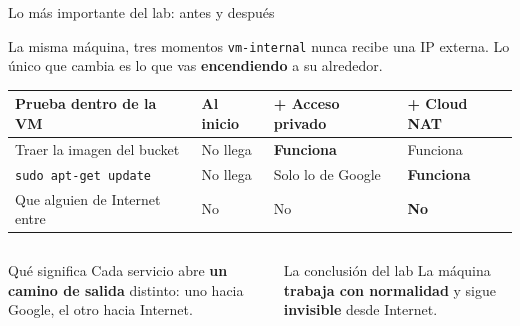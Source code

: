 \documentclass[aspectratio=169,10pt,c]{beamer}
\begin{document}
\begin{frame}{Lo más importante del lab: antes y después}
\begin{block}{La misma máquina, tres momentos}
\small \texttt{vm-internal} nunca recibe una IP externa. Lo único que cambia es lo que vas \textbf{encendiendo} a su alrededor.
\end{block}
\renewcommand{\arraystretch}{1.35}
\centering\small
\begin{tabular}{@{}p{4.9cm}p{2.3cm}p{2.6cm}p{2.6cm}@{}}
\toprule
\textbf{Prueba dentro de la VM} & \textbf{Al inicio} & \textbf{+ Acceso privado} & \textbf{+ Cloud NAT}\\
\midrule
Traer la imagen del bucket & No llega & \textbf{Funciona} & Funciona\\
\texttt{sudo apt-get update} & No llega & Solo lo de Google & \textbf{Funciona}\\
Que alguien de Internet entre & No & No & \textbf{No}\\
\bottomrule
\end{tabular}
\par\vspace{2mm}
\begin{columns}[T,onlytextwidth]
\begin{exampleblock}{Qué significa}
\small Cada servicio abre \textbf{un camino de salida} distinto: uno hacia Google, el otro hacia Internet.
\end{exampleblock}
\begin{alertblock}{La conclusión del lab}
\small La máquina \textbf{trabaja con normalidad} y sigue \textbf{invisible} desde Internet.
\end{alertblock}
\end{columns}
\end{frame}
\end{document}
